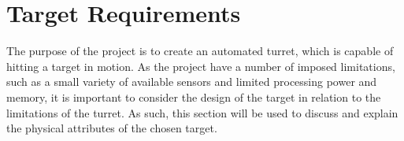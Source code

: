 \section{Target Requirements}\label{TargetReq}
The purpose of the project is to create an automated turret, which is capable of
hitting a target in motion. As the project have a number of imposed limitations,
such as a small variety of available sensors and limited processing power and
memory, it is important to consider the design of the target in relation to the
limitations of the turret. As such, this section will be used to discuss and
explain the physical attributes of the chosen target.
